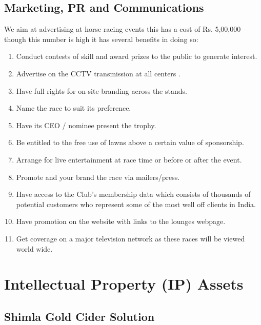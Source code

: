 \documentclass[11pt]{article}
\begin{document}
  \subsection{Marketing, PR and Communications}


We aim at advertising at horse racing events this has a cost of Rs. 5,00,000 though this number is high it has several benefits in doing so:
\begin{enumerate}
\item Conduct contests of skill and award prizes to the public to generate interest. 
\item Advertise on the CCTV transmission at all centers .
\item Have full rights for on-site branding across the stands.
\item Name the race to suit its preference.
\item Have its CEO / nominee present the trophy.
\item Be entitled to the free use of lawns above a certain value of sponsorship.
\item Arrange for live entertainment at race time or before or after the event.
\item Promote and your brand the race via mailers/press.
\item Have access to the Club's membership data which consists of thousands of potential customers who represent some of the most well off clients in India.
\item Have promotion on the website with links to the lounges webpage.
\item Get coverage on a major television network as these races will be viewed world wide.
\end{enumerate}

\newpage
\section{Intellectual Property (IP) Assets}
  \subsection{Shimla Gold Cider Solution}
\end{document}
